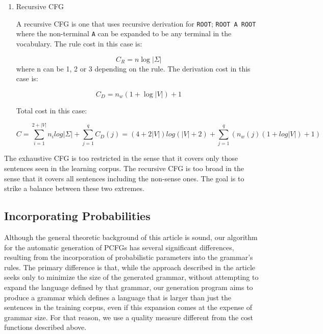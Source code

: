 \documentclass[paper=a4, fontsize=11pt]{scrartcl} %
\numberwithin{equation}{section} %
\numberwithin{figure}{section} %
\numberwithin{table}{section} %
\begin{document}
\begin{enumerate}[1.]
\item Recursive CFG

A recursive CFG is one that uses recursive derivation for \texttt{ROOT}; \texttt{ROOT \textrightarrow A ROOT} where the non-terminal \texttt{A} can be expanded to be any terminal in the vocabulary.
The rule cost in this case is:

\begin{equation}\label{first}
C_R = n \log \lvert \Sigma \rvert
\end{equation}
where n can be 1, 2 or 3 depending on the rule.
The derivation cost in this case is:

\begin{equation}\label{first}
C_D = n_w(1 + \log \lvert V \rvert) + 1
\end{equation}

Total cost in this case:

\begin{equation}\label{first}
C = \sum \limits_{i=1}^{2+\lvert V \rvert}n_i log \lvert \Sigma \rvert + \sum \limits_{j=1}^q C_D(j) = (4 + 2\lvert V \rvert)log(\lvert V \rvert + 2) + \sum \limits_{j=1}^q (n_w(j)(1 + log \lvert V \rvert) + 1)
\end{equation}

\end{enumerate}

The exhaustive CFG is too restricted in the sense that it covers only those sentences seen in the learning corpus. The recursive CFG is too broad in the sense that it covers all sentences including the non-sense ones. The goal is to strike a balance between these two extremes.

\subsection{Incorporating Probabilities}
Although the general theoretic background of this article is sound, our algorithm for the automatic generation of PCFGs has several significant differences, resulting from the incorporation of probabilistic parameters into the grammar's rules. The primary difference is that, while the approach described in the article seeks only to minimize the size of the generated grammar, without attempting to expand the language defined by that grammar, our generation program aims to produce a grammar which defines a language that is larger than just the sentences in the training corpus, even if this expansion comes at the expense of grammar size. For that reason, we use a quality measure different from the cost functions described above.
\end{document}

